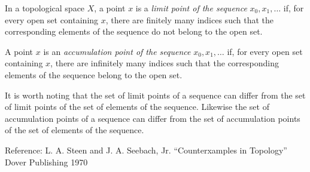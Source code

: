 \documentclass[12pt]{article}
\begin{document}
In a topological space $X$, a point $x$ is a \emph{limit point of the sequence} $x_0, x_1, \ldots$ if, for every open set containing $x$, there are finitely many indices such that the corresponding elements of the sequence do not belong to the open set. 

A point $x$ is an \emph{accumulation point of the sequence} $x_0, x_1, \ldots$ if, for every open set containing $x$, there are infinitely many indices such that the corresponding elements of the sequence belong to the open set.

It is worth noting that the set of limit points of a sequence can differ from the set of limit points of the set of elements of the sequence.  Likewise the set of accumulation points of a sequence can differ from the set of accumulation points of the set of elements of the sequence.

Reference: L. A. Steen and J. A. Seebach, Jr.  ``Counterxamples in Topology'' Dover Publishing 1970
\end{document}

